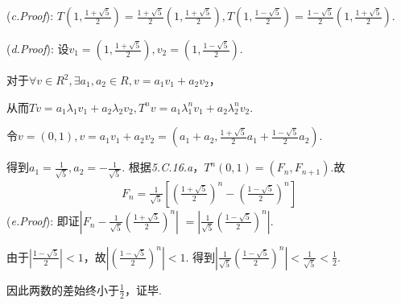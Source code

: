 (\textit{c.Proof}):
$T(1,\frac{1+\sqrt{5}}{2})=\frac{1+\sqrt{5}}{2}(1,\frac{1+\sqrt{5}}{2}),
T(1,\frac{1-\sqrt{5}}{2})=\frac{1-\sqrt{5}}{2}(1,\frac{1+\sqrt{5}}{2})$.

(\textit{d.Proof}):
设$v_1=(1,\frac{1+\sqrt{5}}{2}),v_2=(1,\frac{1-\sqrt{5}}{2})$.

对于$\forall v \in R^2,\exists a_1,a_2 \in R,v=a_1v_1+a_2v_2$，

从而$Tv=a_1\lambda_1 v_1+a_2\lambda_2 v_2,T^n v=a_1\lambda_1^n v_1+a_2\lambda_2^n v_2$.

令$v=(0,1),v=a_1v_1+a_2v_2=(a_1+a_2,\frac{1+\sqrt{5}}{2}a_1+\frac{1-\sqrt{5}}{2}a_2)$.

得到$a_1=\frac{1}{\sqrt{5}},a_2=-\frac{1}{\sqrt{5}}$.
根据\textit{5.C.16.a}，$T^n(0,1)=(F_n,F_{n+1})$.故
    \begin{align*}
        F_n=\frac{1}{\sqrt{5}}[(\frac{1+\sqrt{5}}{2})^n-(\frac{1-\sqrt{5}}{2})^n]
    \end{align*}
(\textit{e.Proof}):
即证$\left\lvert F_n-\frac{1}{\sqrt{5}}(\frac{1+\sqrt{5}}{2})^n \right\rvert$
$=\left\lvert \frac{1}{\sqrt{5}}(\frac{1-\sqrt{5}}{2})^n \right\rvert$.

由于$\left\lvert \frac{1-\sqrt{5}}{2} \right\rvert<1$，故$\left\lvert (\frac{1-\sqrt{5}}{2})^n \right\rvert <1$.
得到$\left\lvert \frac{1}{\sqrt{5}}(\frac{1-\sqrt{5}}{2})^n \right\rvert <\frac{1}{\sqrt{5}}<\frac{1}{2}$.

因此两数的差始终小于$\frac{1}{2}$，证毕.

